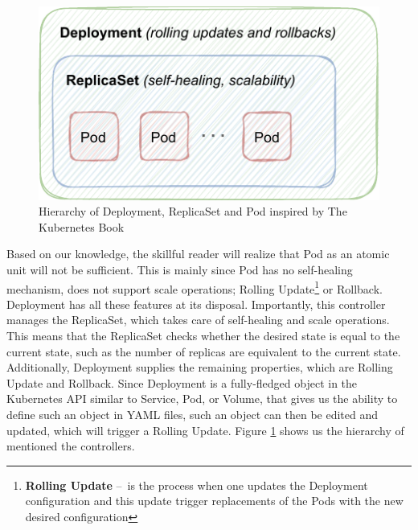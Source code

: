 \begin{enumerate}
    \begin{figure}[!htb]
        \centering
        \includegraphics[scale=1.2]{obrazky-figures/02-preliminaries/01-kubernetes/03-deplyoment-archite.pdf}
        \caption{Hierarchy of Deployment, ReplicaSet and Pod inspired by The Kubernetes Book \cite{kubernetesBook}}
        \label{fig:kubernetes:deploymentReplicaSetPod}
    \end{figure}
    Based on our knowledge, the skillful reader will realize that Pod as an atomic unit will not be sufficient.
    This is mainly since Pod has no self-healing mechanism, does not support scale operations;
    Rolling Update\footnote{\textbf{Rolling Update} \---\ is the process when one updates the Deployment configuration and this update trigger replacements of the Pods with the new desired configuration} or Rollback.
    Deployment has all these features at its disposal.
    Importantly, this controller manages the ReplicaSet, which takes care of self-healing and scale operations.
    This means that the ReplicaSet checks whether the desired state is equal to the current state, such as the number of replicas are equivalent to the current state.
    Additionally, Deployment supplies the remaining properties, which are Rolling Update and Rollback.
    Since Deployment is a fully-fledged object in the Kubernetes API similar to Service, Pod, or Volume, that gives us the ability to define such an object in YAML files, such an object can then be edited and updated, which will trigger a Rolling Update.
    Figure \ref{fig:kubernetes:deploymentReplicaSetPod} shows us the hierarchy of mentioned the controllers.


\end{enumerate}

